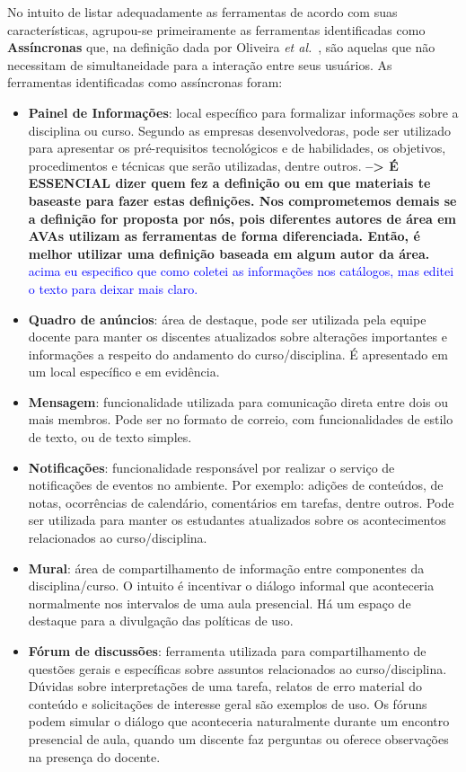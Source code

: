No intuito de listar adequadamente as ferramentas de acordo com suas características, agrupou-se primeiramente as ferramentas identificadas como \textbf{Assíncronas} que, na definição dada por Oliveira \textit{et al.}~\cite{dotta@ead}, são aquelas que não necessitam de simultaneidade para a interação entre seus usuários. As ferramentas identificadas como assíncronas foram: 
\begin{itemize}
\item \textbf{Painel de Informações}: local específico para formalizar informações sobre a disciplina ou curso. Segundo as empresas desenvolvedoras, pode ser utilizado para apresentar os pré-requisitos tecnológicos e de habilidades, os objetivos, procedimentos e técnicas que serão utilizadas, dentre outros.
\textbf{--> É ESSENCIAL dizer quem fez a definição ou em que materiais te baseaste para fazer estas definições. Nos comprometemos demais se a definição for proposta por nós, pois diferentes autores de área em AVAs utilizam as ferramentas de forma diferenciada. Então, é melhor utilizar uma definição baseada em algum autor da área.} \textcolor{blue} {acima eu especifico que como coletei as informações nos catálogos, mas editei o texto para deixar mais claro.}
\item \textbf{Quadro de anúncios}: área de destaque, pode ser utilizada pela equipe docente para manter os discentes atualizados sobre alterações importantes e informações a respeito do andamento do curso/disciplina. É apresentado em um local específico e em evidência.
\item \textbf{Mensagem}: funcionalidade utilizada para comunicação direta entre dois ou mais membros. Pode ser no formato de correio, com funcionalidades de estilo de texto, ou de texto simples.
\item \textbf{Notificações}: funcionalidade responsável por realizar o serviço de notificações de eventos no ambiente. Por exemplo: adições de conteúdos, de notas, ocorrências de calendário, comentários em tarefas, dentre outros. Pode ser utilizada para manter os estudantes atualizados sobre os acontecimentos relacionados ao curso/disciplina.
\item \textbf{Mural}: área de compartilhamento de informação entre componentes da disciplina/curso. O intuito é incentivar o diálogo informal que aconteceria normalmente nos intervalos de uma aula presencial. Há um espaço de destaque para a divulgação das políticas de uso.
\item \textbf{Fórum de discussões}: ferramenta utilizada para compartilhamento de questões gerais e específicas sobre assuntos relacionados ao curso/disciplina. Dúvidas sobre interpretações de uma tarefa, relatos de erro material do conteúdo e solicitações de interesse geral são exemplos de uso. Os fóruns podem simular o diálogo que aconteceria naturalmente durante um encontro presencial de aula, quando um discente faz perguntas ou oferece observações na presença do docente.

\end{itemize}
